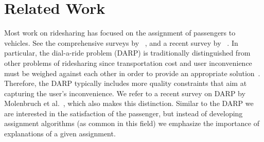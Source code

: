 \documentclass[letterpaper]{article} %
\begin{document}
%
%
%






\section{Related Work}



Most work on ridesharing has focused on the assignment of passengers to vehicles. See the comprehensive surveys by \citeauthor{parragh2008a}~\cite{parragh2008a,parragh2008b}, and a recent survey by \citeauthor{psaraftis2016dynamic}~\cite{psaraftis2016dynamic}.
In particular, the dial-a-ride problem (DARP) is traditionally distinguished from other problems of ridesharing since transportation cost and user inconvenience must be weighed against each other in order to provide an appropriate solution~\cite{cordeau2003tabu}. Therefore, the DARP typically includes more quality constraints that aim at capturing the user's inconvenience. We refer to a recent survey on DARP by Molenbruch et al.~\cite{molenbruch2017}, which also makes this distinction. 
Similar to the DARP we are interested in the satisfaction of the passenger, but instead of developing assignment algorithms (as common in this field) we emphasize the importance of explanations of a given assignment.
\end{document}
